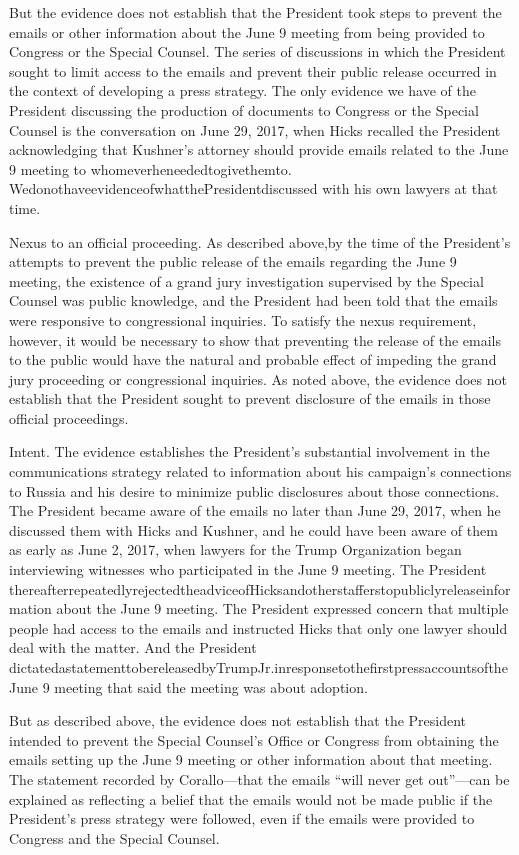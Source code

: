 But the evidence does not establish that the President took steps to prevent the emails or other information about the June 9 meeting from being provided to Congress or the Special Counsel. The series of discussions in which the President sought to limit access to the emails and prevent their public release occurred in the context of developing a press strategy. The only evidence we have of the President discussing the production of documents to Congress or the Special Counsel is the conversation on June 29, 2017, when Hicks recalled the President acknowledging that Kushner's attorney should provide emails related to the June 9 meeting to whomeverheneededtogivethemto. WedonothaveevidenceofwhatthePresidentdiscussed with his own lawyers at that time.

Nexus to an official proceeding. As described above,by the time of the President's attempts to prevent the public release of the emails regarding the June 9 meeting, the existence of a grand jury investigation supervised by the Special Counsel was public knowledge, and the President had been told that the emails were responsive to congressional inquiries. To satisfy the nexus requirement, however, it would be necessary to show that preventing the release of the emails to the public would have the natural and probable effect of impeding the grand jury proceeding or congressional inquiries. As noted above, the evidence does not establish that the President sought to prevent disclosure of the emails in those official proceedings.

Intent. The evidence establishes the President's substantial involvement in the communications strategy related to information about his campaign's connections to Russia and his desire to minimize public disclosures about those connections. The President became aware of the emails no later than June 29, 2017, when he discussed them with Hicks and Kushner, and he could have been aware of them as early as June 2, 2017, when lawyers for the Trump Organization began interviewing witnesses who participated in the June 9 meeting. The President thereafterrepeatedlyrejectedtheadviceofHicksandotherstafferstopubliclyreleaseinformation about the June 9 meeting. The President expressed concern that multiple people had access to the emails and instructed Hicks that only one lawyer should deal with the matter. And the President dictatedastatementtobereleasedbyTrumpJr.inresponsetothefirstpressaccountsoftheJune 9 meeting that said the meeting was about adoption.

But as described above, the evidence does not establish that the President intended to prevent the Special Counsel's Office or Congress from obtaining the emails setting up the June 9 meeting or other information about that meeting. The statement recorded by Corallo—that the emails “will never get out”—can be explained as reflecting a belief that the emails would not be made public if the President's press strategy were followed, even if the emails were provided to Congress and the Special Counsel.

